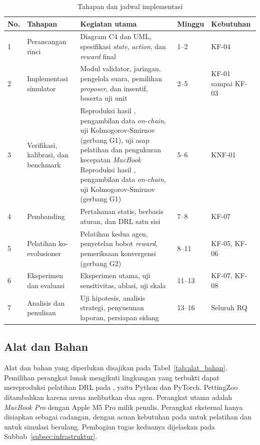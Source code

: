 \begin{table}[htbp]
\centering
\caption{Tahapan dan jadwal implementasi}
\label{tab:jadwal}
\small
\begin{tabular}{|p{0.7cm}|p{3.0cm}|p{4.5cm}|p{1.4cm}|p{2.2cm}|}
\hline
\textbf{No.} & \textbf{Tahapan} & \textbf{Kegiatan utama} & \textbf{Minggu} & \textbf{Kebutuhan} \\
\hline
1 & Perancangan rinci & Diagram C4 dan UML, spesifikasi \textit{state}, \textit{action}, dan \textit{reward} final & 1--2 & KF-04 \\
\hline
2 & Implementasi simulator & Modul validator, jaringan, pengelola suara, pemilihan \textit{proposer}, dan insentif, beserta uji unit & 2--5 & KF-01 sampai KF-03 \\
\hline
3 & Verifikasi, kalibrasi, dan benchmark & Reproduksi hasil \textcite{laneve2025stochastic}, pengambilan data \textit{on-chain}, uji Kolmogorov-Smirnov (gerbang G1), uji asap pelatihan dan pengukuran kecepatan \textit{MacBook} Reproduksi hasil \textcite{laneve2025stochastic}, pengambilan data \textit{on-chain}, uji Kolmogorov-Smirnov (gerbang G1) & 5--6 & KNF-01 \\
\hline
4 & Pembanding & Pertahanan statis, berbasis aturan, dan DRL satu sisi & 7--8 & KF-07 \\
\hline
5 & Pelatihan ko-evolusioner & Pelatihan kedua agen, penyetelan bobot \textit{reward}, pemeriksaan konvergensi (gerbang G2) & 8--11 & KF-05, KF-06 \\
\hline
6 & Eksperimen dan evaluasi & Eksperimen utama, uji sensitivitas, ablasi, uji skala & 11--13 & KF-07, KF-08 \\
\hline
7 & Analisis dan penulisan & Uji hipotesis, analisis strategi, penyusunan laporan, persiapan sidang & 13--16 & Seluruh RQ \\
\hline
\end{tabular}
\end{table}

\subsection{Alat dan Bahan}
\label{subsec:alat_bahan}
Alat dan bahan yang diperlukan disajikan pada Tabel~\ref{tab:alat_bahan}. Pemilihan perangkat lunak mengikuti lingkungan yang terbukti dapat mereproduksi pelatihan DRL pada \textcite{skowronski2026adaptive}, yaitu Python dan PyTorch. PettingZoo ditambahkan karena arena melibatkan dua agen. Perangkat utama adalah \textit{MacBook Pro} dengan Apple M5 Pro milik penulis. Perangkat eksternal hanya disiapkan sebagai cadangan, dengan acuan kebutuhan pada \textcite{skowronski2026adaptive} untuk pelatihan dan \textcite{laneve2025stochastic} untuk simulasi berulang. Pembagian tugas keduanya dijelaskan pada Subbab~\ref{subsec:infrastruktur}.

